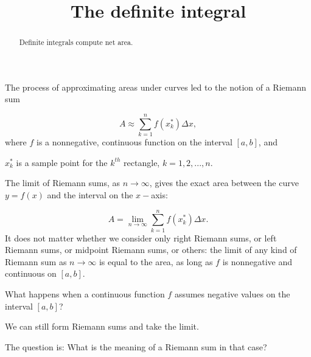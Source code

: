 \documentclass{ximera}
\title[Dig-In:]{The definite integral}
\begin{document}
\begin{abstract}
  Definite integrals compute net area.
\end{abstract}
\maketitle




The process of approximating areas under curves led to the notion of a Riemann sum

\[
A\approx\sum_{k=1}^n f(x_k^*)\Delta x,
\]
where $f$ is a nonnegative, continuous function on the interval $[a,b]$, and

 $x_k^*$ is a sample point for the $k^{th}$ rectangle, $k=1,2,..., n$.
 
 The limit of Riemann sums, as $n\to\infty$, gives the exact area between the curve $y=f(x)$ and the interval on the $x-$axis:
 
\[
A=\lim_{n\to\infty}\sum_{k=1}^n f(x_k^*)\Delta x.
\]
It does not matter whether we consider only right Riemann sums, or left Riemann sums, or midpoint Riemann sums, or others: the limit of any kind of Riemann sum as $n\to\infty$  is equal to the area, as long as $f$ is nonnegative and continuous on $[a,b]$. 


 
What happens when a continuous function $f$ assumes negative values  on the interval $[a,b]$?

We can still form Riemann sums and take the limit. 

The question is: What is the meaning of a Riemann sum in that case?
\end{document}
